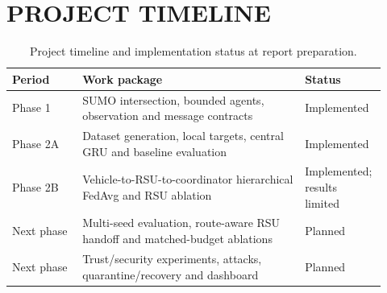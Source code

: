 \chapter*{PROJECT TIMELINE}
\begin{table}[ht]
\centering
\caption{Project timeline and implementation status at report preparation.}
\begin{tabular}{p{0.18\linewidth}p{0.58\linewidth}p{0.16\linewidth}}
\toprule
Period & Work package & Status\\
\midrule
Phase 1 & SUMO intersection, bounded agents, observation and message contracts & Implemented\\
Phase 2A & Dataset generation, local targets, central GRU and baseline evaluation & Implemented\\
Phase 2B & Vehicle-to-RSU-to-coordinator hierarchical FedAvg and RSU ablation & Implemented; results limited\\
Next phase & Multi-seed evaluation, route-aware RSU handoff and matched-budget ablations & Planned\\
Next phase & Trust/security experiments, attacks, quarantine/recovery and dashboard & Planned\\
\bottomrule
\end{tabular}
\end{table}
